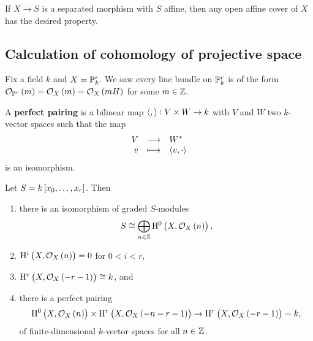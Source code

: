 \begin{remark*}
If $ X \to S $ is a separated morphism with $ S $ affine, then any open affine cover of $ X $ has the desired property.
\end{remark*}

\pagebreak

\subsection{Calculation of cohomology of projective space}

Fix a field $ k $ and $ X = \mathbb{P}_k^r $. We saw every line bundle on $ \mathbb{P}_k^r $ is of the form $ \OOO_{\PP^r}\br{m} = \OOO_X\br{m} = \OOO_X\br{mH} $ for some $ m \in \mathbb{Z} $.

\begin{definition*}
A \textbf{perfect pairing} is a bilinear map $ \left\langle , \right\rangle : V \times W \to k $ with $ V $ and $ W $ two $ k $-vector spaces such that the map
$$ \function{V}{W^*}{v}{\abr{v, \cdot}} $$
is an isomorphism.
\end{definition*}

\begin{theorem}
Let $ S = k\sbr{x_0, \dots, x_r} $. Then
\begin{enumerate}
\item there is an isomorphism of graded $ S $-modules
$$ S \cong \bigoplus_{n \in \ZZ} \H^0\br{X, \OOO_X\br{n}}, $$
\item $ \H^i\br{X, \OOO_X\br{n}} = 0 $ for $ 0 < i < r $,
\item $ \H^r\br{X, \OOO_X\br{-r - 1}} \cong k $, and
\item there is a perfect pairing
$$ \H^0\br{X, \OOO_X\br{n}} \times \H^r\br{X, \OOO_X\br{-n - r - 1}} \to \H^r\br{X, \OOO_X\br{-r - 1}} = k, $$
of finite-dimensional $ k $-vector spaces for all $ n \in \mathbb{Z} $.
\end{enumerate}
\end{theorem}

